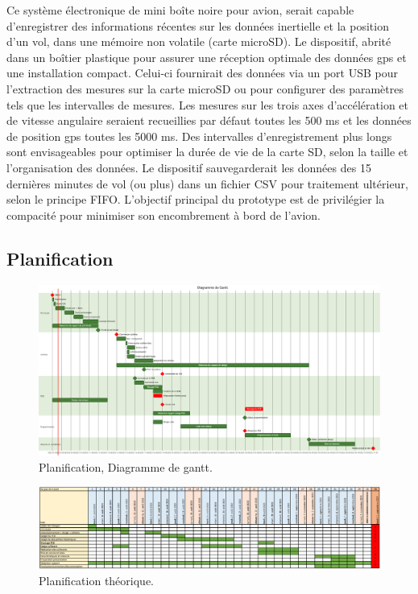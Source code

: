 Ce système électronique de mini boîte noire pour avion, serait capable d'enregistrer des informations récentes sur les données inertielle et la position d'un vol, dans une mémoire non volatile (carte microSD). Le dispositif, abrité dans un boîtier plastique pour assurer une réception optimale des données \gls{gps} et une installation compact. Celui-ci fournirait des données via un port USB pour l'extraction des mesures sur la carte microSD ou pour configurer des paramètres tels que les intervalles de mesures. Les mesures sur les trois axes d'accélération et de vitesse angulaire seraient recueillies par défaut toutes les 500 ms et les données de position \gls{gps} toutes les 5000 ms. Des intervalles d'enregistrement plus longs sont envisageables pour optimiser la durée de vie de la carte SD, selon la taille et l'organisation des données. Le dispositif sauvegarderait les données des 15 dernières minutes de vol (ou plus) dans un fichier CSV pour traitement ultérieur, selon le principe FIFO. L'objectif principal du prototype est de privilégier la compacité pour minimiser son encombrement à bord de l'avion.


\clearpage

\subsection{Planification}
\begin{figure}[h]
	\centering
	\includegraphics[width=1\linewidth]{../figures/cdc/planif}
	\caption{Planification, Diagramme de gantt.}
	\label{fig:planification}
\end{figure}
\begin{figure}[h]
	\centering
	\includegraphics[width=1\linewidth]{../figures/cdc/planif_theorique}
	\caption{Planification théorique.}
	\label{fig:planiftheorique}
\end{figure}


